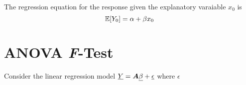 The regression equation for the response given the explanatory varaiable $x_0$ is
\begin{equation}
	\mathbb{E}[Y_0]=\alpha + \beta x_0
\end{equation}

\section{ANOVA \emph{F}-Test}

\begin{definition}
	Consider the linear regression model $\underline{Y} = \bm{A} \underline{\beta}+\underline{\epsilon}$ where $\epsilon $

\end{definition}


